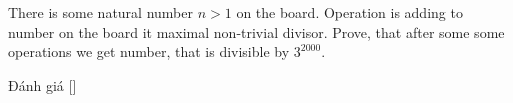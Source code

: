 \ifshowproblem
\begin{problem}\label{problem:RUS-2015-TMO-S-P5}
    There is some natural number $n>1$ on the board. Operation is adding to number on the board it maximal non-trivial divisor.
    Prove, that after some some operations we get number, that is divisible by $3^{2000}$.
\end{problem}
\fi

\ifshowinfo
Đánh giá [\textbf{}]\footnotemark
{}
\fi